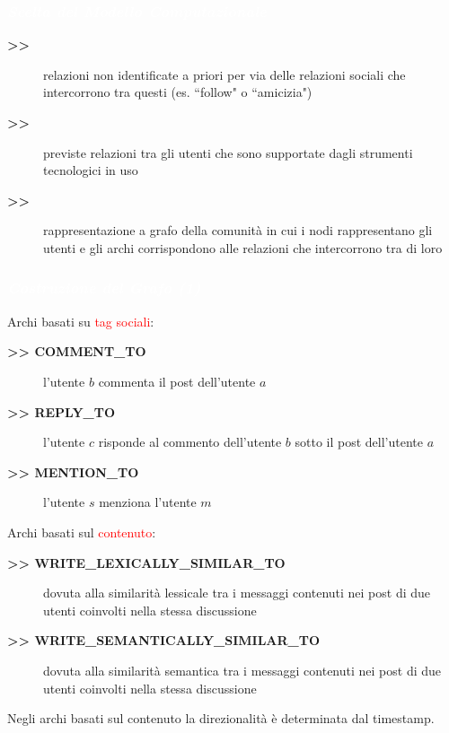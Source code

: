 \documentclass[11pt,xcolor={usenames,dvipsnames,svgnames},compress]{beamer}
\newcommand{\highlighttext}[2][yellow]{{\colorbox{#1}{\textcolor{white}{#2}}}}
\begin{document}
\begin{frame}
  \frametitle{\highlighttext[lacamgreen]{\textbf{\emph{Scelta del Modello Computazionale}}}}
  
  \begin{description}
  \item[\textbf{>>}] relazioni non identificate a priori per via delle relazioni sociali che intercorrono tra questi (es. ``follow" o ``amicizia")
  \item[\textbf{>>}] previste relazioni tra gli utenti che sono supportate dagli strumenti tecnologici in uso
  
  \item[\textbf{\Large >>}] rappresentazione a grafo della comunit{\`a} in cui i nodi rappresentano gli utenti e gli archi corrispondono alle relazioni che intercorrono tra di loro
  \end{description}\bigskip
  
\end{frame}

\begin{frame}
  \frametitle{\highlighttext[lacamgreen]{\textbf{\emph{Costruzione del Grafo (1)}}}}
   
   Archi basati su \textcolor{red}{tag sociali}:
   \begin{description}
  \item[\textbf{>> COMMENT\_TO}] l'utente \( b \) commenta il post dell'utente \( a \)
  \item[\textbf{>> REPLY\_TO}] l'utente \( c \) risponde al commento dell'utente \( b \) sotto il post dell'utente \( a \)
  \item[\textbf{>> MENTION\_TO}] l'utente \( s \) menziona l'utente \( m \)
  \end{description} \par

	Archi basati sul \textcolor{red}{contenuto}:
   \begin{description}
  \item[\textbf{>> WRITE\_LEXICALLY\_SIMILAR\_TO}] dovuta alla similarit{\`a} lessicale tra i messaggi contenuti nei post di due utenti coinvolti nella stessa discussione
  \item[\textbf{>> WRITE\_SEMANTICALLY\_SIMILAR\_TO}] dovuta alla similarit{\`a} semantica tra i messaggi contenuti nei post di due utenti coinvolti nella stessa discussione
  \end{description} \par

Negli archi basati sul contenuto la direzionalit{\`a} {\`e} determinata dal timestamp. 

\end{frame}
\end{document}
